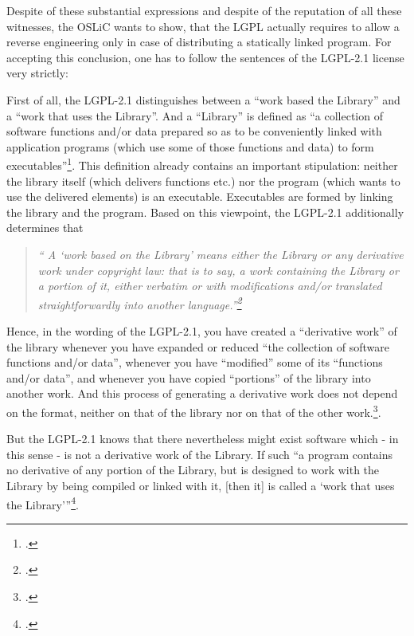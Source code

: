 Despite of these substantial expressions and despite of the reputation of all
these witnesses, the OSLiC wants to show, that the LGPL actually requires to
allow a reverse engineering only in case of distributing a statically linked
program. For accepting this conclusion, one has to follow the sentences of the
LGPL-2.1 license very strictly:

First of all, the LGPL-2.1 distinguishes between a \enquote{work based the
Library} and a \enquote{work that uses the Library}. And a \enquote{Library} is
defined as \enquote{a collection of software functions and/or data prepared so
as to be conveniently linked with application programs (which use some of those
functions and data) to form executables}\footcite[cf.][\nopage
wp §0]{Lgpl21OsiLicense1999a}. This definition already contains an important
stipulation: neither the library itself (which delivers functions etc.) nor the
program (which wants to use the delivered elements) is an executable.
Executables are formed by linking the library and the program. Based on this
viewpoint, the LGPL-2.1 additionally determines that 

\begin{quote}\emph{\enquote{
A \enquote{work based on the Library} means either the Library or any derivative
work under copyright law: that is to say, a work containing the Library or a portion
of it, either verbatim or with modifications and/or translated straightforwardly
into another language.}\footcite[cf.][\nopage wp §0]{Lgpl21OsiLicense1999a} }
\end{quote}

Hence, in the wording of the LGPL-2.1, you have created a \enquote{derivative
work} of the library whenever you have expanded or reduced \enquote{the
collection of software functions and/or data}, whenever you have
\enquote{modified} some of its \enquote{functions and/or data}, and whenever you
have copied \enquote{portions} of the library into another work. And this
process of generating a derivative work does not depend on the format, neither
on that of the library nor on that of the other work.\footcite[cf.][\nopage wp
§0]{Lgpl21OsiLicense1999a}.

But the LGPL-2.1 knows that there nevertheless might exist software which - in
this sense - is not a derivative work of the Library. If such \enquote{a
program contains no derivative of any portion of the Library, but is
designed to work with the Library by being compiled or linked with it, [then
it] is called a \enquote{work that uses the Library}}\footcite[cf.][\nopage wp
§5]{Lgpl21OsiLicense1999a}.

